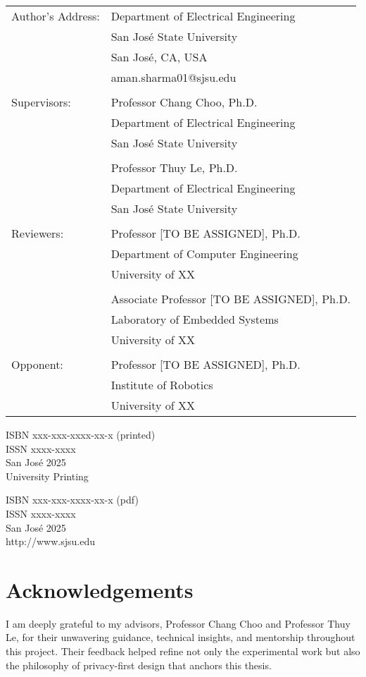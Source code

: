 \documentclass[a4paper,12pt]{article}
\begin{document}
\begin{center}
\begin{tabular}{ll}
Author's Address:
& Department of Electrical Engineering \\
& San José State University \\
& San José, CA, USA \\
& aman.sharma01@sjsu.edu \\
\\
Supervisors:
& Professor Chang Choo, Ph.D.\\
& Department of Electrical Engineering\\
& San José State University\\
\\
& Professor Thuy Le, Ph.D.\\
& Department of Electrical Engineering\\
& San José State University\\
\\
Reviewers:
& Professor [TO BE ASSIGNED], Ph.D.\\
& Department of Computer Engineering\\
& University of XX\\
\\
& Associate Professor [TO BE ASSIGNED], Ph.D.\\
& Laboratory of Embedded Systems\\
& University of XX\\
\\
Opponent:
& Professor [TO BE ASSIGNED], Ph.D. \\
& Institute of Robotics \\
& University of XX
\end{tabular}

\vfill

\begin{multicols}{2}
ISBN  xxx-xxx-xxxx-xx-x (printed) \\
ISSN xxxx-xxxx \\
San José 2025 \\
University Printing

ISBN  xxx-xxx-xxxx-xx-x (pdf) \\
ISSN xxxx-xxxx \\
San José 2025 \\
http://www.sjsu.edu
\end{multicols}
\end{center}

\newpage

\section*{Acknowledgements}
I am deeply grateful to my advisors, Professor Chang Choo and Professor Thuy Le, for their unwavering guidance, technical insights, and mentorship throughout this project. Their feedback helped refine not only the experimental work but also the philosophy of privacy-first design that anchors this thesis. 
\end{document}
